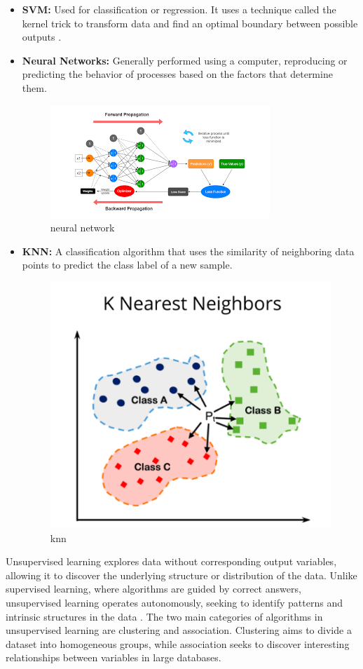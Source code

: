 \begin{itemize}
 
	\item \textbf{{SVM}:} Used for classification or regression. It uses a technique called the kernel trick to transform data and find an optimal boundary between possible outputs \cite{cortes1995support}.



 
	\item \textbf{Neural Networks:} Generally performed using a computer, reproducing or predicting the behavior of processes based on the factors that determine them.


 \begin{figure}[ht!]
     \centering
     \includegraphics[width=0.5\linewidth]{chap1/images/neural network.png}
     \caption{neural network\cite{neuralnetwork2023}}
     \label{fig:enter-label}
 \end{figure}
	\item \textbf{{KNN}:} A classification algorithm that uses the similarity of neighboring data points to predict the class label of a new sample.


 \begin{figure}[ht!]
     \centering
     \includegraphics[width=0.5\linewidth]{chap1/images/knn.png}
     \caption{knn\cite{knn2023}}
     \label{fig:enter-label}
 \end{figure}
\end{itemize}


Unsupervised learning explores data without corresponding output variables, allowing it to discover the underlying structure or distribution of the data. Unlike supervised learning, where algorithms are guided by correct answers, unsupervised learning operates autonomously, seeking to identify patterns and intrinsic structures in the data \cite{ismaili2019}. The two main categories of algorithms in unsupervised learning are clustering and association. Clustering aims to divide a dataset into homogeneous groups, while association seeks to discover interesting relationships between variables in large databases.

